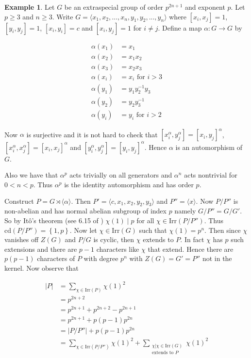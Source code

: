 \documentclass[]{amsart}
\theoremstyle{definition}
\theoremstyle{definition}
\theoremstyle{definition}
\newtheorem{ex}[theorem]{Example}
\theoremstyle{definition}
\theoremstyle{remark}
\theoremstyle{remark}
\newcommand{\set}[1]{\left\{{#1}\right\}}
\begin{document}
        \begin{ex}
            Let $G$ be an extraspecial group of order $p^{2n+1}$ and exponent $p$. Let $p\geq 3$ and $n\geq 3$. Write $G=\langle x_1,x_2,...,x_n,y_1,y_2,...,y_n\rangle$ where $[x_i,x_j]=1$, $[y_i,y_j]=1$, $[x_i,y_i]=c$ and $[x_i,y_j]=1$ for $i\neq j$. Define a map $\alpha:G\to G$ by 
            
            \begin{align*}
                \alpha(x_1)&=x_1\\
                \alpha(x_2)&=x_1x_2\\
                \alpha(x_3)&=x_2x_3 \\
                \alpha(x_i)&=x_i \text{ for } i>3\\
                \alpha(y_1)&=y_1y_2^{-1}y_3\\
                \alpha(y_2)&=y_2y_3^{-1} \\
                \alpha(y_i)&=y_i \text{ for } i>2
            \end{align*}

            Now $\alpha$ is surjective and it is not hard to check that $[x_i^{\alpha},y_j^{\alpha}]=[x_i,y_j]^{\alpha}$, $[x_i^\alpha,x_j^{\alpha}]=[x_i,x_j]^{\alpha}$ and $[y_i^{\alpha},y_j^{\alpha}]=[y_i,y_j]^{\alpha}$. Hence $\alpha$ is an automorphism of $G$. 
        
            Also we have that $\alpha^p$ acts trivially on all generators and $\alpha^n$ acts nontrivial for $0<n<p$. Thus $\alpha^p$ is the identity automorphism and has order $p$. 

            Construct $P=G\rtimes \langle \alpha \rangle$. Then $P'=\langle c, x_1, x_2, y_2,y_3\rangle$ and $P''=\langle x \rangle$. Now $P/P''$ is non-abelian and has normal abelian subgroup of index $p$ namely $G/P''=G/G'$. So by It\^{o}'s theorem (see 6.15 of \cite{Isa2}) $\chi(1)\mid p$ for all $\chi \in \mathrm{Irr}(P/P'')$. Thus $\mathrm{cd}(P/P'')=\set{1,p}$. Now let $\chi \in \mathrm{Irr}(G)$ such that $\chi(1)=p^n$. Then since $\chi$ vanishes off $Z(G)$ and $P/G$ is cyclic, then $\chi$ extends to $P$. In fact $\chi$ has $p$ such extensions and there are $p-1$ characters like $\chi$ that extend. Hence there are $p(p-1)$ characters of $P$ with degree $p^n$ with $Z(G)=G'=P''$ not in the kernel. Now observe that 
            
            \begin{align*}
                |P|&=\sum_{\chi \in \mathrm{Irr}(P)} \chi(1)^2\\
                &=p^{2n+2}\\
                &=p^{2n+1}+p^{2n+2}-p^{2n+1}\\
                &=p^{2n+1}+p(p-1)p^{2n}\\
                &=|P/P''|+p(p-1)p^{2n}\\
                &=\sum_{\chi\in \mathrm{Irr}(P/P'')}\chi(1)^2+\sum_{\substack{\chi| \chi\in \mathrm{Irr}(G) \\ \text{extends to } P}} \chi(1)^2
            \end{align*}


\end{ex}
\end{document}
